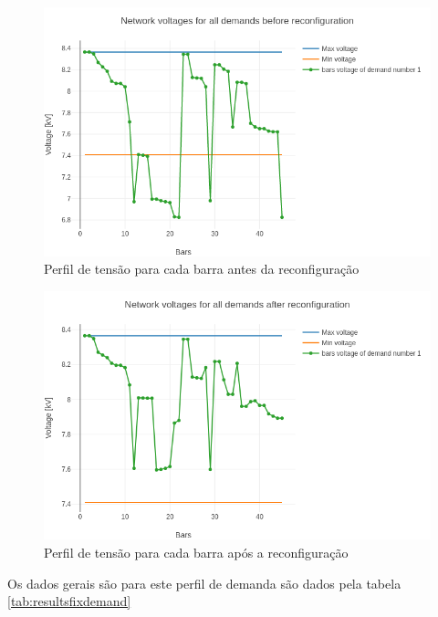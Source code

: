 \begin{figure}[H]
    \centering
    \includegraphics[width=\textwidth]{7_Results/img/45fixvoltages_before.png}
    \caption{Perfil de tensão para cada barra antes da reconfiguração}
    \label{fig:45fixinitial}
\end{figure}

\begin{figure}[H]
    \centering
    \includegraphics[width=\textwidth]{7_Results/img/45fixvoltages_after.png}
    \caption{Perfil de tensão para cada barra após a reconfiguração}
    \label{fig:45fixafter}
\end{figure}

Os dados gerais são para este perfil de demanda são dados pela tabela \ref{tab:resultsfixdemand}

